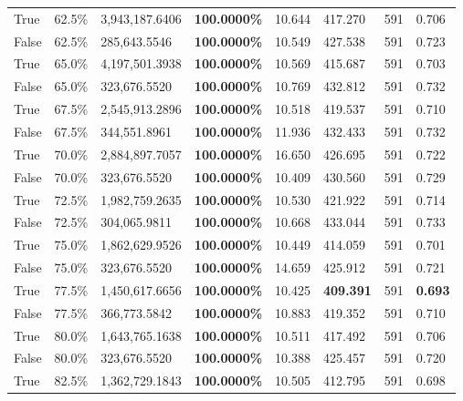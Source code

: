 \begin{table}[H]
\begin{tabular}{lllrllll}
\cline{1-8}
True & 62.5\% & 3,943,187.6406 & \bfseries \color{red} 100.0000\% & 10.644 & 417.270 & 591 & 0.706 \\
\cline{1-8}
False & 62.5\% & \color{red} 285,643.5546 & \bfseries \color{red} 100.0000\% & 10.549 & 427.538 & 591 & 0.723 \\
\cline{1-8}
True & 65.0\% & 4,197,501.3938 & \bfseries \color{red} 100.0000\% & 10.569 & 415.687 & 591 & 0.703 \\
\cline{1-8}
False & 65.0\% & 323,676.5520 & \bfseries \color{red} 100.0000\% & 10.769 & 432.812 & 591 & 0.732 \\
\cline{1-8}
True & 67.5\% & 2,545,913.2896 & \bfseries \color{red} 100.0000\% & 10.518 & 419.537 & 591 & 0.710 \\
\cline{1-8}
False & 67.5\% & 344,551.8961 & \bfseries \color{red} 100.0000\% & 11.936 & 432.433 & 591 & 0.732 \\
\cline{1-8}
True & 70.0\% & 2,884,897.7057 & \bfseries \color{red} 100.0000\% & 16.650 & 426.695 & 591 & 0.722 \\
\cline{1-8}
False & 70.0\% & 323,676.5520 & \bfseries \color{red} 100.0000\% & 10.409 & 430.560 & 591 & 0.729 \\
\cline{1-8}
True & 72.5\% & 1,982,759.2635 & \bfseries \color{red} 100.0000\% & 10.530 & 421.922 & 591 & 0.714 \\
\cline{1-8}
False & 72.5\% & 304,065.9811 & \bfseries \color{red} 100.0000\% & 10.668 & 433.044 & 591 & 0.733 \\
\cline{1-8}
True & 75.0\% & 1,862,629.9526 & \bfseries \color{red} 100.0000\% & 10.449 & 414.059 & 591 & 0.701 \\
\cline{1-8}
False & 75.0\% & 323,676.5520 & \bfseries \color{red} 100.0000\% & 14.659 & 425.912 & 591 & 0.721 \\
\cline{1-8}
True & 77.5\% & 1,450,617.6656 & \bfseries \color{red} 100.0000\% & 10.425 & \bfseries \color{red} 409.391 & 591 & \bfseries \color{red} 0.693 \\
\cline{1-8}
False & 77.5\% & 366,773.5842 & \bfseries \color{red} 100.0000\% & 10.883 & 419.352 & 591 & 0.710 \\
\cline{1-8}
True & 80.0\% & 1,643,765.1638 & \bfseries \color{red} 100.0000\% & 10.511 & 417.492 & 591 & 0.706 \\
\cline{1-8}
False & 80.0\% & 323,676.5520 & \bfseries \color{red} 100.0000\% & 10.388 & 425.457 & 591 & 0.720 \\
\cline{1-8}
True & 82.5\% & 1,362,729.1843 & \bfseries \color{red} 100.0000\% & 10.505 & 412.795 & 591 & 0.698 \\

\end{tabular}
\end{table}
